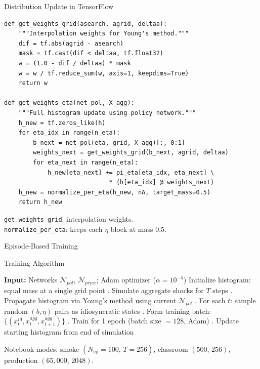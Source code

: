 \documentclass[aspectratio=169,11pt]{beamer}
\begin{document}
\begin{frame}[fragile]{Distribution Update in TensorFlow}
\begin{center}
\begin{minipage}{0.92\textwidth}
\begin{lstlisting}[basicstyle=\tiny\ttfamily, breaklines=true]
def get_weights_grid(asearch, agrid, deltaa):
    """Interpolation weights for Young's method."""
    dif = tf.abs(agrid - asearch)
    mask = tf.cast(dif < deltaa, tf.float32)
    w = (1.0 - dif / deltaa) * mask
    w = w / tf.reduce_sum(w, axis=1, keepdims=True)
    return w

def get_weights_eta(net_pol, X_agg):
    """Full histogram update using policy network."""
    h_new = tf.zeros_like(h)
    for eta_idx in range(n_eta):
        b_next = net_pol(eta, grid, X_agg)[:, 0:1]
        weights_next = get_weights_grid(b_next, agrid, deltaa)
        for eta_next in range(n_eta):
            h_new[eta_next] += pi_eta[eta_idx, eta_next] \
                             * (h[eta_idx] @ weights_next)
    h_new = normalize_per_eta(h_new, nA, target_mass=0.5)
    return h_new
\end{lstlisting}
\end{minipage}
\end{center}

\vspace{-0.2em}
{\footnotesize \texttt{get\_weights\_grid}: interpolation weights.\\
\texttt{normalize\_per\_eta}: keeps each $\eta$ block at mass 0.5.}
\end{frame}

\begin{frame}{Episode-Based Training}
\begin{block}{Training Algorithm}
\begin{algorithmic}
\scriptsize
\STATE \textbf{Input:} Networks $\mathcal{N}_{pol}$, $\mathcal{N}_{price}$; Adam optimizer ($\alpha = 10^{-5}$)
\STATE Initialize histogram: equal mass at a single grid point
    . Simulate aggregate shocks for $T$ steps
    . Propagate histogram via Young's method using current $\mathcal{N}_{pol}$
    \STATE 3. For each $t$: sample random $(b, \eta)$ pairs as idiosyncratic states
    \STATE 4. Form training batch: $\{(x_t^{id}, x_t^{agg}, x_{t+1}^{agg})\}$
    \STATE 5. Train for 1 epoch (batch size $= 128$, Adam)
    . Update starting histogram from end of simulation
\ENDFOR
\end{algorithmic}
\end{block}

\vspace{0.1em}
{\small Notebook modes: smoke $(N_{\text{ep}}=100,\,T=256)$, classroom $(500,\,256)$, production $(65{,}000,\,2048)$.}
\end{frame}
\end{document}

